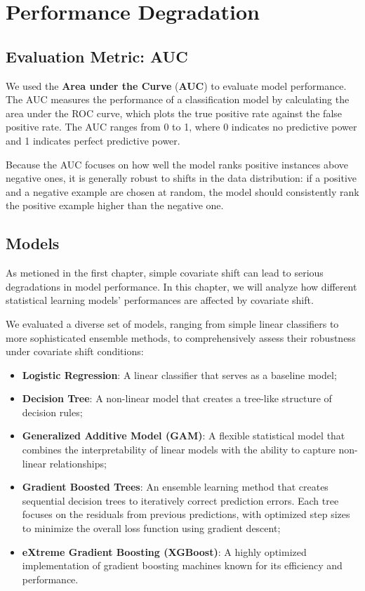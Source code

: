 \chapter{Performance Degradation}

\section{Evaluation Metric: AUC}

We used the \textbf{Area under the Curve} (\textbf{AUC}) to evaluate model performance. The AUC measures the performance of a classification model by calculating the area under the ROC curve, which plots the true positive rate against the false positive rate. The AUC ranges from 0 to 1, where 0 indicates no predictive power and 1 indicates perfect predictive power.

Because the AUC focuses on how well the model ranks positive instances above negative ones, it is generally robust to shifts in the data distribution: if a positive and a negative example are chosen at random, the model should consistently rank the positive example higher than the negative one. 

\section{Models}

As metioned in the first chapter, simple covariate shift can lead to serious degradations in model performance. In this chapter, we will analyze how different statistical learning models' performances are affected by covariate shift. 

We evaluated a diverse set of models, ranging from simple linear classifiers to more sophisticated ensemble methods, to comprehensively assess their robustness under covariate shift conditions:

\begin{itemize}
    \item \textbf{Logistic Regression}: A linear classifier that serves as a baseline model;
    \item \textbf{Decision Tree}: A non-linear model that creates a tree-like structure of decision rules;
    \item \textbf{Generalized Additive Model (GAM)}: A flexible statistical model that combines the interpretability of linear models with the ability to capture non-linear relationships;
    \item \textbf{Gradient Boosted Trees}: An ensemble learning method that creates sequential decision trees to iteratively correct prediction errors. Each tree focuses on the residuals from previous predictions, with optimized step sizes to minimize the overall loss function using gradient descent;
    \item \textbf{eXtreme Gradient Boosting (XGBoost)}: A highly optimized implementation of gradient boosting machines known for its efficiency and performance.
\end{itemize}

